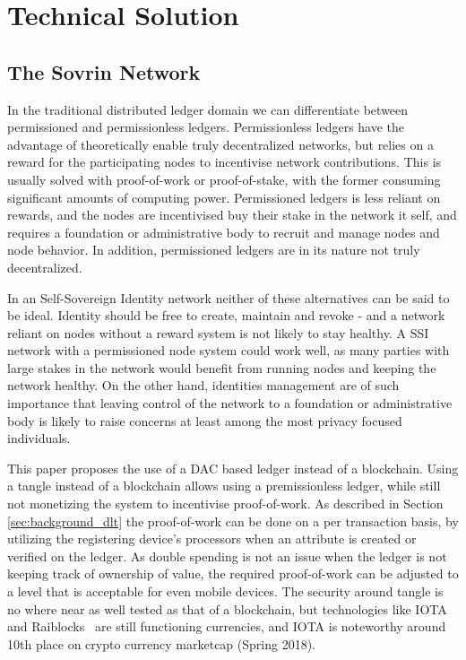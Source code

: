 \chapter{Technical Solution}
\label{chap:solution}

\section{The Sovrin Network}

In the traditional distributed ledger domain we can differentiate between permissioned and permissionless ledgers. Permissionless ledgers have the advantage of theoretically enable truly decentralized networks, but relies on a reward for the participating nodes to incentivise network contributions. This is usually solved with proof-of-work or proof-of-stake, with the former consuming significant amounts of computing power. Permissioned ledgers is less  reliant on rewards, and the nodes are incentivised buy their stake in the network it self, and requires a foundation or administrative body to recruit and manage nodes and node behavior. In addition, permissioned ledgers are in its nature not truly decentralized.

In an Self-Sovereign Identity network neither of these alternatives can be said to be ideal. Identity should be free to create, maintain and revoke - and a network reliant on nodes without a reward system is not likely to stay healthy. A SSI network with a permissioned node system could work well, as many parties with large stakes in the network would benefit from running nodes and keeping the network healthy. On the other hand, identities management are of such importance that leaving control of the network to a foundation or administrative body is likely to raise concerns at least among the most privacy focused individuals.

This paper proposes the use of a DAC based ledger instead of a blockchain. Using a tangle instead of a blockchain allows using a premissionless ledger, while still not monetizing the system to incentivise proof-of-work. As described in Section \ref{sec:background_dlt} the proof-of-work can be done on a per transaction basis, by utilizing the registering device's processors when an attribute is created or verified on the ledger. As double spending is not an issue when the ledger is not keeping track of ownership of value, the required proof-of-work can be adjusted to a level that is acceptable for even mobile devices. The security around tangle is no where near as well tested as that of a blockchain, but technologies like IOTA~\cite{IOTA_Whitepaper} and Raiblocks~\cite{Raiblocks_Whitepaper} are still functioning currencies, and IOTA is noteworthy around 10th place on crypto currency marketcap (Spring 2018).


